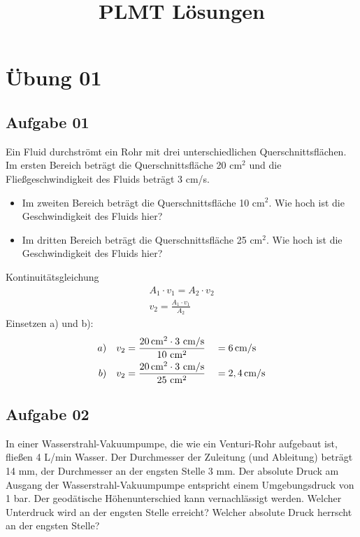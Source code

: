 \documentclass[a4paper,11pt]{article}
\title{PLMT Lösungen}
\begin{document}
\maketitle



\section*{Übung 01}
\subsection*{Aufgabe 01}
Ein Fluid durchströmt ein Rohr mit drei unterschiedlichen Querschnittsflächen. 
Im ersten Bereich beträgt die Querschnittsfläche 20 cm$^2$ und die Fließgeschwindigkeit des Fluids beträgt 3 cm/s.
\begin{itemize}
\item[a] Im zweiten Bereich beträgt die Querschnittsfläche 10 cm$^2$. Wie hoch ist die Geschwindigkeit des Fluids hier?
\item[b] Im dritten Bereich beträgt die Querschnittsfläche 25 cm$^2$. Wie hoch ist die Geschwindigkeit des Fluids hier?
\end{itemize}  

\ppbig
Kontinuitätsgleichung
\begin{align*}
A_1 \cdot v_1 = A_2 \cdot v_2 \\
v_2 = \frac{A_1 \cdot v_1}{A_2}
\end{align*}
Einsetzen a) und b):
\begin{align*}
a) &&v_2 &= \frac{20\cm^2 \cdot 3\mskip3mu \cm/\text{s}}{10\mskip3mu \cm^2} &&= 6\cm/\text{s} \\
b) &&v_2 &= \frac{20\cm^2 \cdot 3\mskip3mu \cm/\text{s}}{25\mskip3mu \cm^2} &&=2,4\cm/\text{s}
\end{align*}


\pagebreak
\subsection*{Aufgabe 02}
In einer Wasserstrahl-Vakuumpumpe, die wie ein Venturi-Rohr aufgebaut ist, fließen 4 L/min Wasser. Der Durchmesser der Zuleitung (und Ableitung) beträgt 14 mm, der Durchmesser an der engsten Stelle 3 mm. Der absolute Druck am Ausgang der Wasserstrahl-Vakuumpumpe entspricht einem Umgebungsdruck von 1 bar. Der geodätische Höhenunterschied kann vernachlässigt werden. 
Welcher Unterdruck wird an der engsten Stelle erreicht? Welcher absolute Druck herrscht an der engsten Stelle?
\ppbig
 
\end{document}
